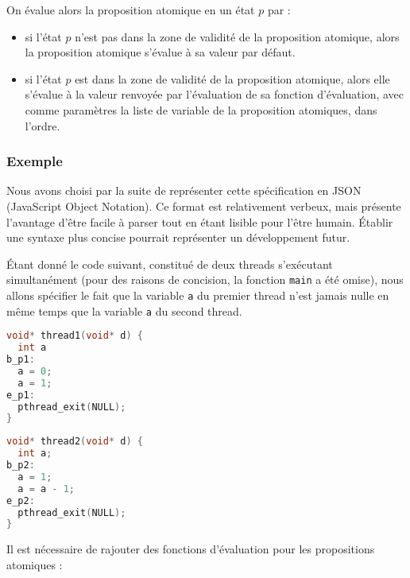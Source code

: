 On évalue alors la proposition atomique en un état \(p\) par :

\begin{itemize}
\item
  si l'état \(p\) n'est pas dans la zone de validité de la proposition
  atomique, alors la proposition atomique s'évalue à sa valeur par
  défaut.
\item
  si l'état \(p\) est dans la zone de validité de la proposition
  atomique, alors elle s'évalue à la valeur renvoyée par l'évaluation de
  sa fonction d'évaluation, avec comme paramètres la liste de variable
  de la proposition atomiques, dans l'ordre.
\end{itemize}

\subsubsection{Exemple}\label{exemple}

Nous avons choisi par la suite de représenter cette spécification en
JSON (JavaScript Object Notation)\cite{json}. Ce format est
relativement verbeux, mais présente l'avantage d'être facile à parser
tout en étant lisible pour l'être humain. Établir une syntaxe plus
concise pourrait représenter un développement futur.

Étant donné le code suivant, constitué de deux threads s'exécutant
simultanément (pour des raisons de concision, la fonction
\texttt{main} a été omise), nous allons spécifier le fait que la
variable \texttt{a} du premier thread n'est jamais nulle en même temps que
la variable \texttt{a} du second thread.

\noindent\begin{minipage}{.45\textwidth}
\begin{lstlisting}[language=C, frame=single, caption=Thread 1]
void* thread1(void* d) {
  int a
b_p1:
  a = 0;
  a = 1;
e_p1:
  pthread_exit(NULL);
}
\end{lstlisting}
\end{minipage}\hfill
\begin{minipage}{.45\textwidth}
\begin{lstlisting}[language=C, frame=single, caption=Thread 2]
void* thread2(void* d) {
  int a;
b_p2:
  a = 1;
  a = a - 1;
e_p2:
  pthread_exit(NULL);
}
\end{lstlisting}
\end{minipage}

Il est nécessaire de rajouter des fonctions d'évaluation pour les
propositions atomiques :

